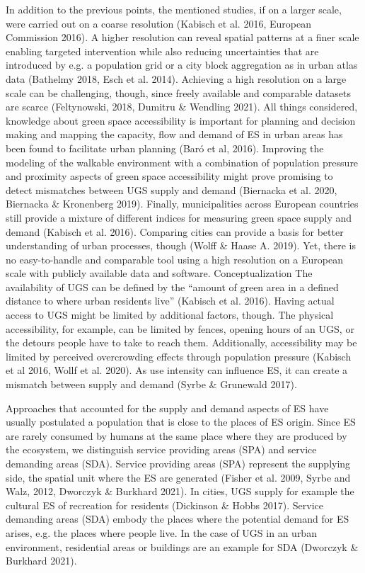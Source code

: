 \documentclass[10pt]{article}
\begin{document}
In addition to the previous points, the mentioned studies, if on a larger scale, were carried out on a coarse resolution (Kabisch et al. 2016, European Commission 2016).
A higher resolution can reveal spatial patterns at a finer scale enabling targeted intervention while also reducing uncertainties that are introduced by e.g. a population grid or a city block aggregation as in urban atlas data (Bathelmy 2018, Esch et al. 2014).
Achieving a high resolution on a large scale can be challenging, though, since freely available and comparable datasets are scarce (Feltynowski, 2018, Dumitru \& Wendling 2021).
All things considered, knowledge about green space accessibility is important for planning and decision making and mapping the capacity, flow and demand of ES in urban areas has been found to facilitate urban planning (Baró et al, 2016).
Improving the modeling of the walkable environment with a combination of population pressure and proximity aspects of green space accessibility might prove promising to detect mismatches between UGS supply and demand (Biernacka et al. 2020, Biernacka \& Kronenberg 2019).
Finally, municipalities across European countries still provide a mixture of different indices for measuring green space supply and demand (Kabisch et al. 2016).
Comparing cities can provide a basis for better understanding of urban processes, though (Wolff \& Haase A. 2019).
Yet, there is no easy-to-handle and comparable tool using a high resolution on a European scale with publicly available data and software.
Conceptualization
The availability of UGS can be defined by the “amount of green area in a defined distance to where urban residents live” (Kabisch et al. 2016).
Having actual access to UGS might be limited by additional factors, though. 
The physical accessibility, for example, can be limited by fences, opening hours of an UGS, or the detours people have to take to reach them. 
Additionally, accessibility may be limited by perceived overcrowding effects through population pressure (Kabisch et al 2016, Wollf et al. 2020).
As use intensity can influence ES, it can create a mismatch between supply and demand (Syrbe \& Grunewald 2017). 

Approaches that accounted for the supply and demand aspects of ES have usually postulated a population that is close to the places of ES origin. 
Since ES are rarely consumed by humans at the same place where they are produced by the ecosystem, we distinguish service providing areas (SPA) and service demanding areas (SDA). 
Service providing areas (SPA) represent the supplying side, the spatial unit where the ES are generated (Fisher et al. 2009, Syrbe and Walz, 2012, Dworczyk \& Burkhard 2021).
In cities, UGS supply for example the cultural ES of recreation for residents (Dickinson \& Hobbs 2017).
Service demanding areas (SDA) embody the places where the potential demand for ES arises, e.g. the places where people live. In the case of UGS in an urban environment, residential areas or buildings are an example for SDA (Dworczyk \& Burkhard 2021).
\end{document}
